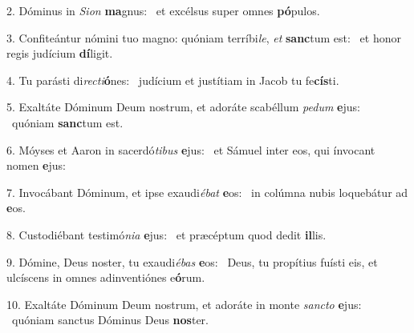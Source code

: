 2. Dóminus in \textit{Si}\textit{on} \textbf{ma}gnus: \ast\  et excélsus super omnes \textbf{pó}pulos.\

3. Confiteántur nómini tuo magno: quóniam terríbi\textit{le}, \textit{et} \textbf{sanc}tum est: \ast\  et honor regis judícium \textbf{dí}ligit.\

4. Tu parásti di\textit{rec}\textit{ti}\textbf{ó}nes: \ast\  judícium et justítiam in Jacob tu fe\textbf{cís}ti.\

5. Exaltáte Dóminum Deum nostrum, et adoráte scabéllum \textit{pe}\textit{dum} \textbf{e}jus: \ast\  quóniam \textbf{sanc}tum est.\

6. Móyses et Aaron in sacerdó\textit{ti}\textit{bus} \textbf{e}jus: \ast\  et Sámuel inter eos, qui ínvocant nomen \textbf{e}jus:\

7. Invocábant Dóminum, et ipse exaudi\textit{é}\textit{bat} \textbf{e}os: \ast\  in colúmna nubis loquebátur ad \textbf{e}os.\

8. Custodiébant testimó\textit{ni}\textit{a} \textbf{e}jus: \ast\  et præcéptum quod dedit \textbf{il}lis.\

9. Dómine, Deus noster, tu exaudi\textit{é}\textit{bas} \textbf{e}os: \ast\  Deus, tu propítius fuísti eis, et ulcíscens in omnes adinventiónes e\textbf{ó}rum.\

10. Exaltáte Dóminum Deum nostrum, et adoráte in monte \textit{sanc}\textit{to} \textbf{e}jus: \ast\  quóniam sanctus Dóminus Deus \textbf{nos}ter.\

